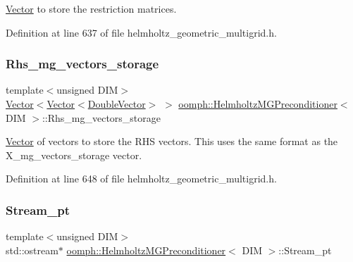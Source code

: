 \hyperlink{classoomph_1_1Vector}{Vector} to store the restriction matrices. 



Definition at line 637 of file helmholtz\+\_\+geometric\+\_\+multigrid.\+h.

\mbox{\label{classoomph_1_1HelmholtzMGPreconditioner_afcd8e10b971adcb3e68eacefd876e833}} 
\subsubsection{\texorpdfstring{Rhs\+\_\+mg\+\_\+vectors\+\_\+storage}{Rhs\_mg\_vectors\_storage}}
{\footnotesize\ttfamily template$<$unsigned D\+IM$>$ \\
\hyperlink{classoomph_1_1Vector}{Vector}$<$\hyperlink{classoomph_1_1Vector}{Vector}$<$\hyperlink{classoomph_1_1DoubleVector}{Double\+Vector}$>$ $>$ \hyperlink{classoomph_1_1HelmholtzMGPreconditioner}{oomph\+::\+Helmholtz\+M\+G\+Preconditioner}$<$ D\+IM $>$\+::Rhs\+\_\+mg\+\_\+vectors\+\_\+storage\hspace{0.3cm}{\ttfamily [private]}}



\hyperlink{classoomph_1_1Vector}{Vector} of vectors to store the R\+HS vectors. This uses the same format as the X\+\_\+mg\+\_\+vectors\+\_\+storage vector. 



Definition at line 648 of file helmholtz\+\_\+geometric\+\_\+multigrid.\+h.

\mbox{\label{classoomph_1_1HelmholtzMGPreconditioner_ab6fb66075019d6d68be33e2dc8332d83}} 
\subsubsection{\texorpdfstring{Stream\+\_\+pt}{Stream\_pt}}
{\footnotesize\ttfamily template$<$unsigned D\+IM$>$ \\
std\+::ostream$\ast$ \hyperlink{classoomph_1_1HelmholtzMGPreconditioner}{oomph\+::\+Helmholtz\+M\+G\+Preconditioner}$<$ D\+IM $>$\+::Stream\+\_\+pt\hspace{0.3cm}{\ttfamily [private]}}



